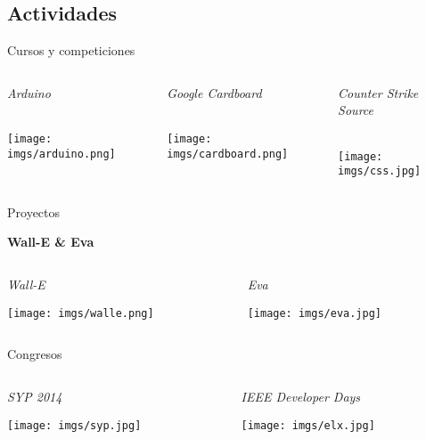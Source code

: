 \subsection{Actividades}
\begin{frame}{Cursos y competiciones}   
    \begin{columns}\begin{column}{0.33\textwidth}
        \centering\large\textit{Arduino} \\~
        
        \texttt{[image: imgs/arduino.png]}
    \end{column}\begin{column}{0.33\textwidth}
        \centering\large\textit{Google Cardboard} \\~
        
        \texttt{[image: imgs/cardboard.png]}
    \end{column}\begin{column}{0.33\textwidth}
        \centering\large\textit{Counter Strike Source} \\~
        
        \texttt{[image: imgs/css.jpg]}
    \end{column}\end{columns}
\end{frame}

\begin{frame}{Proyectos}
    \begin{center}
        \huge\textbf{Wall-E \& Eva}
    \end{center}
    
    \begin{columns}[t]\begin{column}{0.50\textwidth}
        \centering\large\textit{Wall-E}
        
        \texttt{[image: imgs/walle.png]}
    \end{column}\begin{column}{0.50\textwidth}
        \centering\large\textit{Eva}
        
        \texttt{[image: imgs/eva.jpg]}
    \end{column}\end{columns}
\end{frame}

\begin{frame}{Congresos}    
    \begin{columns}\begin{column}{0.50\textwidth}
        \centering\large\textit{SYP 2014}
        
        \texttt{[image: imgs/syp.jpg]}
    \end{column}\begin{column}{0.50\textwidth}
        \centering\large\textit{IEEE Developer Days}
        
        \texttt{[image: imgs/elx.jpg]}
    \end{column}\end{columns}
\end{frame}